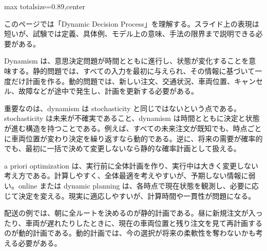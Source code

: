 \begin{minipage}[t]{0.58\textwidth}
\begin{adjustbox}{max totalsize={\textwidth}{0.89\textheight},center}
\begin{minipage}{\textwidth}\scriptsize
{}このページでは「Dynamic Decision Process」を理解する。スライド上の表現は短いが、試験では定義、具体例、モデル上の意味、手法の限界まで説明できる必要がある。\par
Dynamism は、意思決定問題が時間とともに進行し、状態が変化することを意味する。静的問題では、すべての入力を最初に与えられ、その情報に基づいて一度だけ計画を作る。動的問題では、新しい注文、交通状況、車両位置、キャンセル、故障などが途中で発生し、計画を更新する必要がある。\par
重要なのは、dynamism は stochasticity と同じではないという点である。stochasticity は未来が不確実であること、dynamism は時間とともに決定と状態が進む構造を持つことである。例えば、すべての未来注文が既知でも、時点ごとに車両位置が変わり決定を繰り返すなら動的である。逆に、将来の需要が確率的でも、最初に一括で決めて変更しないなら静的な確率計画として扱える。\par
a priori optimization は、実行前に全体計画を作り、実行中は大きく変更しない考え方である。計算しやすく、全体最適を考えやすいが、予期しない情報に弱い。online または dynamic planning は、各時点で現在状態を観測し、必要に応じて決定を変える。現実に適応しやすいが、計算時間や一貫性が問題になる。\par
配送の例では、朝に全ルートを決めるのが静的計画である。昼に新規注文が入ったり、車両が遅れたりしたときに、現在の車両位置と残り注文を見て再計画するのが動的計画である。動的計画では、今の選択が将来の柔軟性を奪わないかも考える必要がある。\par

\end{minipage}
\end{adjustbox}
\end{minipage}
